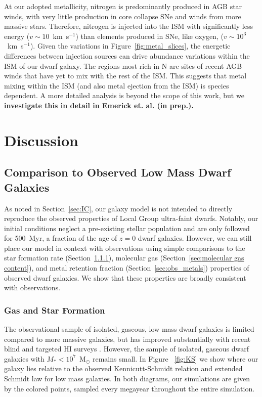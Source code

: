 \documentclass[fleqn,usenatbib,useAMS]{mnras}
\begin{document}
At our adopted metallicity, nitrogen is predominantly produced in AGB star winds, with very little production in core collapse SNe and winds from more massive stars. Therefore, nitrogen is injected into the ISM with significantly less energy ($v \sim 10$~km~s$^{-1}$) than elements produced in SNe, like oxygen, ($v\sim 10^3$~km~s$^{-1}$). Given the variations in Figure~\ref{fig:metal_slices}, the energetic differences between injection sources can drive abundance variations within the ISM of our dwarf galaxy. The regions most rich in N are sites of recent AGB winds that have yet to mix with the rest of the ISM. This suggests that metal mixing within the ISM (and also metal ejection from the ISM) is species dependent. A more detailed analysis is beyond the scope of this work, but we \textbf{investigate this in detail in Emerick et. al. (in prep.).}

\section{Discussion}
\label{sec:discussion}

\subsection{Comparison to Observed Low Mass Dwarf Galaxies}
\label{sec:observation}

As noted in Section~\ref{sec:IC}, our galaxy model is not intended to directly reproduce the observed properties of Local Group ultra-faint dwarfs. Notably, our initial conditions neglect a pre-existing stellar population and are only followed for 500~Myr, a fraction of the age of $z = 0$ dwarf galaxies. However, we can still place our model in context with observations using simple comparisons to the star formation rate (Section~\ref{sec:gas_sf}), molecular gas (Section~\ref{sec:molecular gas content}), and metal retention fraction (Section~\ref{sec:obs_metals}) properties of observed dwarf galaxies. We show that these properties are broadly consistent with observations. 

\subsubsection{Gas and Star Formation}
\label{sec:gas_sf}

The observational sample of isolated, gaseous, low mass dwarf galaxies is limited compared to more massive galaxies, but has improved substantially with recent blind and targeted HI surveys \citep[e.g.][]{Giovanelli2005, Geha2006, Geha2012, Walter2008, Cannon2011, Haynes2011, Hunter2012, Bradford2015, James2015, Tollerud2015, Sand2015, Wang2017}. However, the sample of isolated, gaseous dwarf galaxies with $M_{*} < 10^{7}$~M$_{\odot}$ remains small. In Figure ~\ref{fig:KS} we show where our galaxy lies relative to the observed Kennicutt-Schmidt relation and extended Schmidt law for low mass galaxies. In both diagrams, our simulations are given by the colored points, sampled every megayear throughout the entire simulation. 
\end{document}
